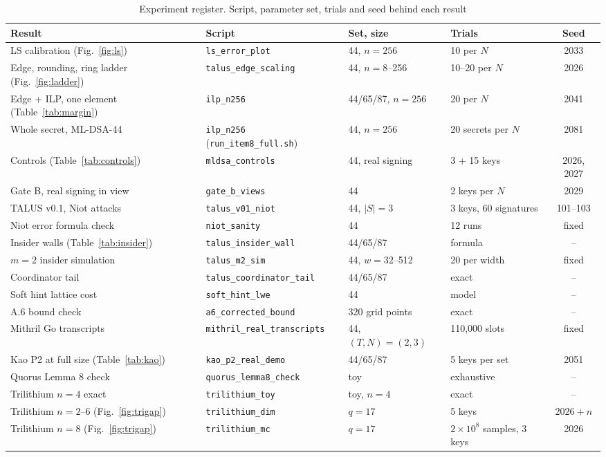 \documentclass[10pt,conference,a4paper]{IEEEtran}
\begin{document}
\begin{table}[t]
\caption{Experiment register. Script, parameter set, trials and seed behind each result}\label{tab:register}
\centering\footnotesize
\begin{tabular}{@{}llllc@{}}
\toprule
Result & Script & Set, size & Trials & Seed\\
\midrule
LS calibration (Fig.~\ref{fig:ls}) & \texttt{ls\_error\_plot} & 44, $n=256$ & 10 per $N$ & 2033\\
Edge, rounding, ring ladder (Fig.~\ref{fig:ladder}) & \texttt{talus\_edge\_scaling} & 44, $n=8$--256 & 10--20 per $N$ & 2026\\
Edge + ILP, one element (Table~\ref{tab:margin}) & \texttt{ilp\_n256} & 44/65/87, $n=256$ & 20 per $N$ & 2041\\
Whole secret, ML-DSA-44 & \texttt{ilp\_n256} (\texttt{run\_item8\_full.sh}) & 44, $n=256$ & 20 secrets per $N$ & 2081\\
Controls (Table~\ref{tab:controls}) & \texttt{mldsa\_controls} & 44, real signing & 3 + 15 keys & 2026, 2027\\
Gate B, real signing in view & \texttt{gate\_b\_views} & 44 & 2 keys per $N$ & 2029\\
TALUS v0.1, Niot attacks & \texttt{talus\_v01\_niot} & 44, $|S|=3$ & 3 keys, 60 signatures & 101--103\\
Niot error formula check & \texttt{niot\_sanity} & 44 & 12 runs & fixed\\
Insider walls (Table~\ref{tab:insider}) & \texttt{talus\_insider\_wall} & 44/65/87 & formula & --\\
$m=2$ insider simulation & \texttt{talus\_m2\_sim} & 44, $w=32$--512 & 20 per width & fixed\\
Coordinator tail & \texttt{talus\_coordinator\_tail} & 44/65/87 & exact & --\\
Soft hint lattice cost & \texttt{soft\_hint\_lwe} & 44 & model & --\\
A.6 bound check & \texttt{a6\_corrected\_bound} & 320 grid points & exact & --\\
Mithril Go transcripts & \texttt{mithril\_real\_transcripts} & 44, $(T,N)=(2,3)$ & 110{,}000 slots & fixed\\
Kao P2 at full size (Table~\ref{tab:kao}) & \texttt{kao\_p2\_real\_demo} & 44/65/87 & 5 keys per set & 2051\\
Quorus Lemma 8 check & \texttt{quorus\_lemma8\_check} & toy & exhaustive & --\\
Trilithium $n=4$ exact & \texttt{trilithium\_toy} & toy, $n=4$ & exact & --\\
Trilithium $n=2$--6 (Fig.~\ref{fig:trigap}) & \texttt{trilithium\_dim} & $q=17$ & 5 keys & $2026+n$\\
Trilithium $n=8$ (Fig.~\ref{fig:trigap}) & \texttt{trilithium\_mc} & $q=17$ & $2\times10^8$ samples, 3 keys & 2026\\
\bottomrule
\end{tabular}
\end{table}
\end{document}
